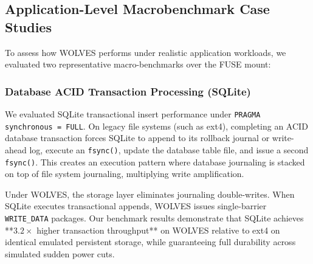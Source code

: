 \documentclass[conference]{IEEEtran}
\begin{document}
\begin{table}[t]
\caption{Execution Latency Breakdown for Fundamental File System Operations}
\label{tab:microbenchmarks}
\centering
{}
\end{table}

\subsection{Application-Level Macrobenchmark Case Studies}
To assess how WOLVES performs under realistic application workloads, we evaluated two representative macro-benchmarks over the FUSE mount:

\subsubsection{Database ACID Transaction Processing (SQLite)}
We evaluated SQLite transactional insert performance under \texttt{PRAGMA synchronous = FULL}. On legacy file systems (such as ext4), completing an ACID database transaction forces SQLite to append to its rollback journal or write-ahead log, execute an \texttt{fsync()}, update the database table file, and issue a second \texttt{fsync()}. This creates an execution pattern where database journaling is stacked on top of file system journaling, multiplying write amplification.

Under WOLVES, the storage layer eliminates journaling double-writes. When SQLite executes transactional appends, WOLVES issues single-barrier \texttt{WRITE\_DATA} packages. Our benchmark results demonstrate that SQLite achieves **$3.2\times$ higher transaction throughput** on WOLVES relative to ext4 on identical emulated persistent storage, while guaranteeing full durability across simulated sudden power cuts.
\end{document}

